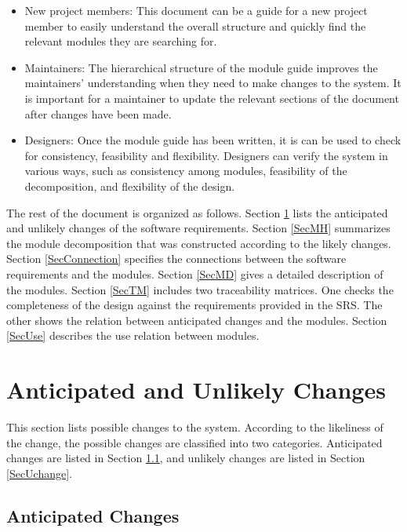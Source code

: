 \documentclass[12pt]{article}
\begin{document}
\begin{itemize}
\item New project members: This document can be a guide for a new
  project member to easily understand the overall structure and
  quickly find the relevant modules they are searching for.
\item Maintainers: The hierarchical structure of the module guide
  improves the maintainers' understanding when they need to make
  changes to the system. It is important for a maintainer to update
  the relevant sections of the document after changes have been made.
\item Designers: Once the module guide has been written, it is can be
  used to check for consistency, feasibility and
  flexibility. Designers can verify the system in various ways, such
  as consistency among modules, feasibility of the decomposition, and
  flexibility of the design.
\end{itemize}

The rest of the document is organized as follows. Section
\ref{SecChange} lists the anticipated and unlikely changes of the
software requirements. Section \ref{SecMH} summarizes the module
decomposition that was constructed according to the likely
changes. Section \ref{SecConnection} specifies the connections between
the software requirements and the modules. Section \ref{SecMD} gives a
detailed description of the modules. Section \ref{SecTM} includes two
traceability matrices. One checks the completeness of the design
against the requirements provided in the SRS. The other shows the
relation between anticipated changes and the modules. Section
\ref{SecUse} describes the use relation between modules.

\section{Anticipated and Unlikely Changes} \label{SecChange}

\hspace{3ex}This section lists possible changes to the
system. According to the likeliness of the change, the possible
changes are classified into two categories. Anticipated changes are
listed in Section \ref{SecAchange}, and unlikely changes are listed in
Section \ref{SecUchange}.

\subsection{Anticipated Changes} \label{SecAchange}
\end{document}
